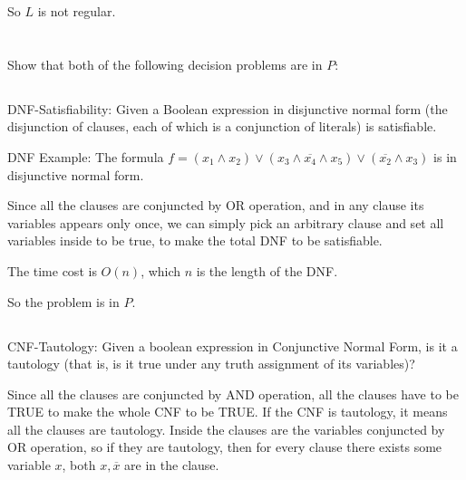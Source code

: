 \documentclass[paper=a4, fontsize=11pt]{scrartcl} %
\begin{document}
So $L$ is not regular.

\pagebreak

\section{}

\begin{fancyquotes}
  Show that both of the following decision problems are in $P$:
\end{fancyquotes}

\subsection{}
\begin{fancyquotes}
  DNF-Satisfiability: Given a Boolean expression in disjunctive normal
  form (the disjunction of clauses, each of which is a conjunction of
  literals) is satisfiable.

  DNF Example: The formula $f=(x_1\wedge
  x_2)\vee(x_3\wedge\overline{x_4}\wedge x_5)\vee(\overline{x_2}\wedge
  x_3)$ is in disjunctive normal form.
\end{fancyquotes}

Since all the clauses are conjuncted by OR operation,
and in any clause its variables appears only once,
we can simply pick an arbitrary clause and set all variables inside to
be true, to make the total DNF to be satisfiable.

The time cost is $O(n)$, which $n$ is the length of the DNF\@.

So the problem is in $P$.

\subsection{}
\begin{fancyquotes}
  CNF-Tautology: Given a boolean expression in Conjunctive Normal
  Form, is it a tautology (that is, is it true under any truth
  assignment of its variables)?
\end{fancyquotes}

Since all the clauses are conjuncted by AND operation,
all the clauses have to be TRUE to make the whole CNF to be TRUE\@.
If the CNF is tautology, it means all the clauses are tautology.
Inside the clauses are the variables conjuncted by OR operation,
so if they are tautology, then for every clause there exists some
variable $x$, both $x,\overline{x}$ are in the clause.
\end{document}
